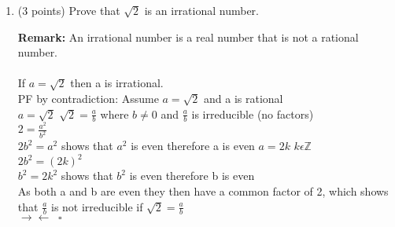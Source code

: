 \documentclass[12pt]{article}
\begin{document}
\begin{enumerate}
    \item (3 points) Prove that $\sqrt{2}$ is an irrational number.  
    
    \textbf{Remark:} An irrational number is a real number that is not a rational number.  \\
    \\ 
    If $a=\sqrt{2}$ then a is irrational.  \\ 
    PF by contradiction: Assume $a=\sqrt{2}$ and a is rational \\
    $a = \sqrt{2}$ \;\;\; $\sqrt{2} = \frac{a}{b}$ where $b \neq 0$  and $\frac{a}{b}$ is irreducible (no factors) \\ 
    $2 = \frac{a^2}{b^2}$ \\ 
    $2b^2= a^2$ \;\; shows that $a^2$ is even therefore a is even $a = 2k$ \;\; $k \epsilon \mathbb{Z}$\\
    $2b^2 = (2k)^2$ \\
    $b^2 = 2k^2$ \;\; shows that $b^2$ is even therefore b is even \\ 
    As both a and b are even they then have a common factor of 2, which shows that $\frac{a}{b}$ is not irreducible if $\sqrt{2} = \frac{a}{b}$ \\ 
    $ \rightarrow \leftarrow \;\; \square$ \\ 
    
\end{enumerate}
\end{document}
